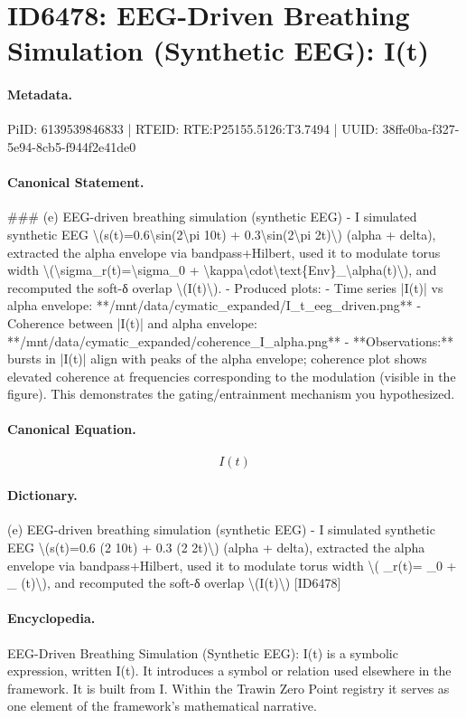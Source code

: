 \section*{ID6478: EEG-Driven Breathing Simulation (Synthetic EEG): I(t)}
\paragraph{Metadata.}
PiID: 6139539846833 | RTEID: RTE:P25155.5126:T3.7494 | UUID: 38ffe0ba-f327-5e94-8cb5-f944f2e41de0

\paragraph{Canonical Statement.}
\#\#\# (e) EEG-driven breathing simulation (synthetic EEG) - I simulated synthetic EEG \textbackslash{}(s(t)=0.6\textbackslash{}sin(2\textbackslash{}pi 10t) + 0.3\textbackslash{}sin(2\textbackslash{}pi 2t)\textbackslash{}) (alpha + delta), extracted the alpha envelope via bandpass+Hilbert, used it to modulate torus width \textbackslash{}(\textbackslash{}sigma\_r(t)=\textbackslash{}sigma\_0 + \textbackslash{}kappa\textbackslash{}cdot\textbackslash{}text\{Env\}\_\textbackslash{}alpha(t)\textbackslash{}), and recomputed the soft-δ overlap \textbackslash{}(I(t)\textbackslash{}). - Produced plots: - Time series |I(t)| vs alpha envelope: **/mnt/data/cymatic\_expanded/I\_t\_eeg\_driven.png** - Coherence between |I(t)| and alpha envelope: **/mnt/data/cymatic\_expanded/coherence\_I\_alpha.png** - **Observations:** bursts in |I(t)| align with peaks of the alpha envelope; coherence plot shows elevated coherence at frequencies corresponding to the modulation (visible in the figure). This demonstrates the gating/entrainment mechanism you hypothesized.

\paragraph{Canonical Equation.}
\[
I(t)
\]

\paragraph{Dictionary.}
(e) EEG-driven breathing simulation (synthetic EEG) - I simulated synthetic EEG \textbackslash{}(s(t)=0.6 (2 10t) + 0.3 (2 2t)\textbackslash{}) (alpha + delta), extracted the alpha envelope via bandpass+Hilbert, used it to modulate torus width \textbackslash{}( \_r(t)= \_0 + \_ (t)\textbackslash{}), and recomputed the soft-δ overlap \textbackslash{}(I(t)\textbackslash{}) [ID6478]

\paragraph{Encyclopedia.}
EEG-Driven Breathing Simulation (Synthetic EEG): I(t) is a symbolic expression, written I(t). It introduces a symbol or relation used elsewhere in the framework. It is built from I. Within the Trawin Zero Point registry it serves as one element of the framework's mathematical narrative.
